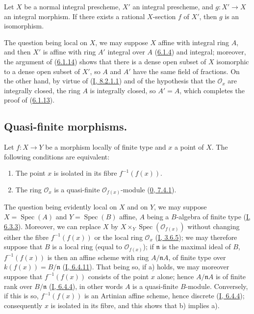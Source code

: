 \begin{corollary}[6.1.15]
\label{II.6.1.15}
Let $X$ be a normal integral prescheme, $X'$ an integral prescheme, and
$g:X'\to X$ an integral morphism. If there exists a rational $X$-section $f$
of $X'$, then $g$ is an isomorphism.
\end{corollary}

The question being local on $X$, we may suppose $X$ affine with integral
ring $A$, and then $X'$ is affine with ring $A'$ integral over $A$
(\hyperref[II.6.1.4]{6.1.4}) and integral; moreover, the argument of
(\hyperref[II.6.1.14]{6.1.14}) shows that there is a dense open subset of
$X$ isomorphic to a dense open subset of $X'$, so $A$ and $A'$ have the same
field of fractions. On the other hand, by virtue of
(\hyperref[I.8.2.1.1]{I, 8.2.1.1}) and of the hypothesis that the
$\mathcal{O}_x$ are integrally closed, the ring $A$ is integrally closed,
so $A'=A$, which completes the proof of
(\hyperref[II.6.1.13]{6.1.13}).

\subsection{Quasi-finite morphisms.}
\label{subsection:II.6.2}

\begin{proposition}[6.2.1]
\label{II.6.2.1}
Let $f:X\to Y$ be a morphism locally of finite type and $x$ a point of $X$.
The following conditions are equivalent:


\begin{enumerate}
\item[a)] The point $x$ is isolated in its fibre $f^{-1}(f(x))$.
\item[b)] The ring $\mathcal{O}_x$ is a quasi-finite
$\mathcal{O}_{f(x)}$-module (\hyperref[0.7.4.1]{0, 7.4.1}).
\end{enumerate}
\end{proposition}

The question being evidently local on $X$ and on $Y$, we may suppose
$X=\operatorname{Spec}(A)$ and $Y=\operatorname{Spec}(B)$ affine, $A$ being
a $B$-algebra of finite type (\hyperref[I.6.3.3]{I, 6.3.3}). Moreover, we
can replace $X$ by $X\times_Y\operatorname{Spec}(\mathcal{O}_{f(x)})$
without changing either the fibre $f^{-1}(f(x))$ or the local ring
$\mathcal{O}_x$ (\hyperref[I.3.6.5]{I, 3.6.5}); we may therefore suppose
that $B$ is a local ring (equal to $\mathcal{O}_{f(x)}$); if $\mathfrak{n}$
is the maximal ideal of $B$, $f^{-1}(f(x))$ is then an affine scheme with
ring $A/\mathfrak{n}A$, of finite type over $k(f(x))=B/\mathfrak{n}$
(\hyperref[I.6.4.11]{I, 6.4.11}). That being so, if a) holds, we may
moreover suppose that $f^{-1}(f(x))$ consists of the point $x$ alone; hence
$A/\mathfrak{n}A$ is of finite rank over $B/\mathfrak{n}$
(\hyperref[I.6.4.4]{I, 6.4.4}), in other words $A$ is a quasi-finite
$B$-module. Conversely, if this is so, $f^{-1}(f(x))$ is an Artinian affine
scheme, hence discrete (\hyperref[I.6.4.4]{I, 6.4.4}); consequently $x$
is isolated in its fibre, and this shows that b) implies a).

